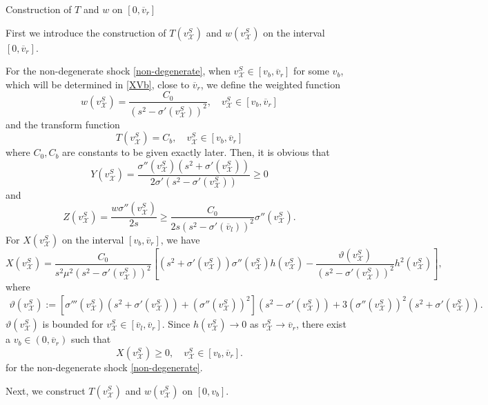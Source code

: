 \documentclass[12pt,reqno]{amsart}
\numberwithin{equation}{section}
\def\vsx{v^S_{\mathcal{X}}}
\def\avl{\overline{v}_l}
\def\avr{\overline{v}_r}
\begin{document}
\begin{part}{Construction of $T$ and $w$ on $[0,\avr]$}

First we introduce the construction of $T(\vsx)$ and $w(\vsx)$ on the interval $[0,\avr]$.

 For the non-degenerate shock \eqref{non-degenerate}, when  $\vsx\in[v_b,\avr]$ for some $v_b$, which will be determined in \eqref{XVb}, close to $\avr$, we define the weighted function 
 \begin{equation}
 	w(\vsx)=\frac{C_0}{(s^2-\sigma'(\vsx))^2},\quad \vsx\in[v_b,\avr]
 \end{equation}
and the transform function
\begin{equation}
	T(\vsx)=C_b,\quad \vsx\in[v_b,\avr]
\end{equation}
where $C_0,C_b$ are constants to be given exactly later. Then, it is obvious that
\begin{equation}
	Y(\vsx)=\frac{\sigma''(\vsx)(s^2+\sigma'(\vsx))}{2\sigma'(s^2-\sigma'(\vsx))}\geq 0
\end{equation}
and 
\begin{equation}
	Z(\vsx)=\frac{w\sigma''(\vsx)}{2s}\geq \frac{C_0}{2s(s^2-\sigma'(\avl))^2}\sigma''(\vsx).
\end{equation}
For $X(\vsx)$ on the interval $[v_b,\avr]$, we have 
\begin{equation}\label{part11}
	X(\vsx)=\frac{C_0}{s^2\mu^2(s^2-\sigma'(\vsx))^2}\left[(s^2+\sigma'(\vsx))\sigma''(\vsx)h(\vsx)- \frac{\vartheta(\vsx)}{(s^2-\sigma'(\vsx))^2}h^2(\vsx)\right],
\end{equation}
where
\begin{align*}
	\vartheta(\vsx):=[\sigma'''(\vsx)(s^2+\sigma'(\vsx))+(\sigma''(\vsx))^2](s^2-\sigma'(\vsx))+3(\sigma''(\vsx))^2(s^2+\sigma'(\vsx)).
\end{align*}
$\vartheta(\vsx)$ is bounded for $\vsx \in [\avl,\avr]$. Since $h(\vsx)\to 0$ as $\vsx \to \avr$, there exist a $v_b\in(0,\avr)$  such that  
\begin{equation}\label{XVb}
	X(\vsx)\geq 0, \quad \vsx\in[v_b,\avr].
\end{equation}
for the non-degenerate shock \eqref{non-degenerate}.

Next, we construct  $T(\vsx)$ and $w(\vsx)$ on $[0,v_b]$. 


\end{part}
\end{document}
